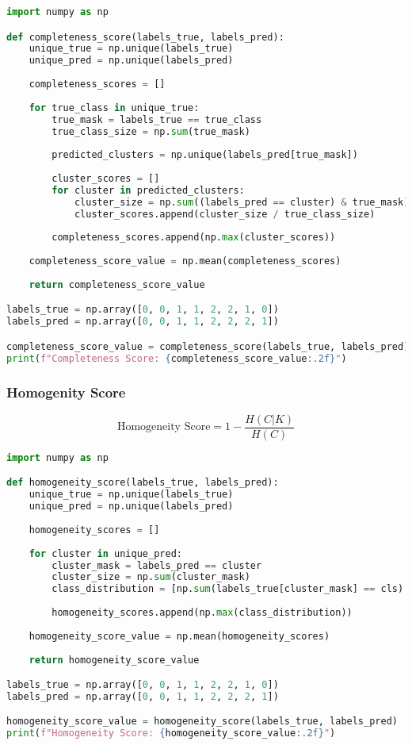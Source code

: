 \begin{lstlisting}[language=Python]
import numpy as np

def completeness_score(labels_true, labels_pred):
    unique_true = np.unique(labels_true)
    unique_pred = np.unique(labels_pred)
    
    completeness_scores = []
    
    for true_class in unique_true:
        true_mask = labels_true == true_class
        true_class_size = np.sum(true_mask)
        
        predicted_clusters = np.unique(labels_pred[true_mask])
        
        cluster_scores = []
        for cluster in predicted_clusters:
            cluster_size = np.sum((labels_pred == cluster) & true_mask)
            cluster_scores.append(cluster_size / true_class_size)
        
        completeness_scores.append(np.max(cluster_scores))
    
    completeness_score_value = np.mean(completeness_scores)
    
    return completeness_score_value

labels_true = np.array([0, 0, 1, 1, 2, 2, 1, 0])
labels_pred = np.array([0, 0, 1, 1, 2, 2, 2, 1])

completeness_score_value = completeness_score(labels_true, labels_pred)
print(f"Completeness Score: {completeness_score_value:.2f}")
\end{lstlisting}

\newpage

\subsubsection{Homogenity Score}

\[\text{Homogeneity Score} = 1 - \frac{H(C|K)}{H(C)}\]

\begin{lstlisting}[language=Python]
import numpy as np

def homogeneity_score(labels_true, labels_pred):
    unique_true = np.unique(labels_true)
    unique_pred = np.unique(labels_pred)
    
    homogeneity_scores = []
    
    for cluster in unique_pred:
        cluster_mask = labels_pred == cluster
        cluster_size = np.sum(cluster_mask)
        class_distribution = [np.sum(labels_true[cluster_mask] == cls) / cluster_size for cls in unique_true]
        
        homogeneity_scores.append(np.max(class_distribution))
    
    homogeneity_score_value = np.mean(homogeneity_scores)
    
    return homogeneity_score_value

labels_true = np.array([0, 0, 1, 1, 2, 2, 1, 0])
labels_pred = np.array([0, 0, 1, 1, 2, 2, 2, 1])

homogeneity_score_value = homogeneity_score(labels_true, labels_pred)
print(f"Homogeneity Score: {homogeneity_score_value:.2f}")
\end{lstlisting}

